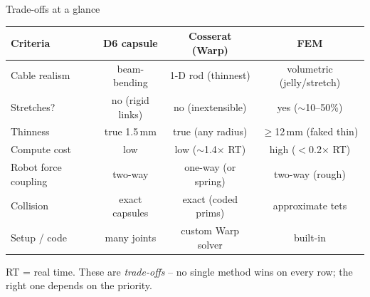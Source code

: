 \documentclass[aspectratio=169]{beamer}
\begin{document}
\begin{frame}{Trade-offs at a glance}
  \centering\renewcommand{\arraystretch}{1.25}
  \begin{tabular}{lccc}
    \toprule
    \textbf{Criteria} & \textbf{D6 capsule} & \textbf{Cosserat (Warp)} & \textbf{FEM} \\
    \midrule
    Cable realism       & beam-bending       & 1-D rod (thinnest)      & volumetric (jelly/stretch) \\
    Stretches?          & no (rigid links)   & no (inextensible)       & yes ($\sim$10--50\%) \\
    Thinness            & true 1.5\,mm       & true (any radius)       & $\geq$12\,mm (faked thin) \\
    Compute cost        & low                & low ($\sim$1.4$\times$ RT) & high ($<$0.2$\times$ RT) \\
    Robot force coupling& two-way            & one-way (or spring)     & two-way (rough) \\
    Collision           & exact capsules     & exact (coded prims)     & approximate tets \\
    Setup / code        & many joints        & custom Warp solver      & built-in \\
    \bottomrule
  \end{tabular}
  \vfill
  {\footnotesize RT = real time. These are \emph{trade-offs} -- no single method wins
   on every row; the right one depends on the priority.}
\end{frame}
\end{document}
